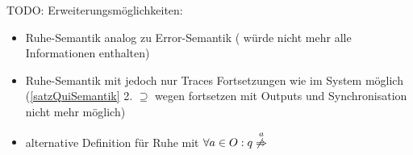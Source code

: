 \scriptsize\textcolor{lgray}{TODO: Erweiterungsmöglichkeiten:
\begin{itemize}
  \item Ruhe-Semantik analog zu Error-Semantik (\EL{} würde nicht mehr alle
    Informationen enthalten)
  \item Ruhe-Semantik mit \prune{} jedoch nur Traces Fortsetzungen wie im System
    möglich (\ref{satzQuiSemantik} 2. $\supseteq$ wegen fortsetzen mit Outputs
    und Synchronisation nicht mehr möglich)
  \item alternative Definition für Ruhe mit $\forall a\in O: q
    \overset{a}{\not{\hspace{-0.1cm}\Rightarrow}}$
\end{itemize}}

\normalsize
